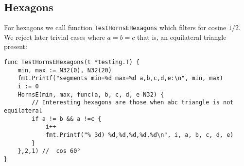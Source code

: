 \documentclass[11pt]{article}
\begin{document}
\newcommand{\horns}[8]{ %
 \begin{tikzpicture}
 \def\a{#3};\def\b{#4};\def\c{#5};\def\d{#6};\def\e{#7};\def\ang{#8}
 \pgfmathsetmacro\f{#4+#6}
 \pgfmathsetmacro\angB{(pow(#3,2) + pow(#5,2) - pow(#4,2))/(2*#3*#5)} %
 \pgfmathsetmacro\angC{(pow(#3,2) + pow(#4,2) - pow(#5,2))/(2*#3*#4)} %
 \begin{scope}
  \meccanostrip[FF0000]{#7}{#1}{#2} %
 \end{scope}
 \begin{scope}[shift={(#1*#7,0)},rotate=\ang]
  \meccanostrip[FF0000]{#7}{#1}{#2} %
  \begin{scope}[rotate=acos(\angB)]
   \meccanostrip[008800]{#5}{#1}{#2} %
  \end{scope}
  \begin{scope}[shift={(#1*#3,0)},rotate=180-acos(\angC)] %
   \meccanostrip[0000FF]{\f}{#1}{#2} %
  \end{scope}
 \end{scope}
 \begin{scope}[rotate=180-\ang]
  \meccanostrip[F00000]{#7}{#1}{#2} %
  \begin{scope}[rotate=-acos(\angB)]
   \meccanostrip[008800]{\c}{#1}{#2} %
  \end{scope}
  \begin{scope}[shift={(#1*\a,0)},rotate=180+acos(\angC)]
   \meccanostrip[0000FF]{\f}{#1}{#2} %
  \end{scope}
 \end{scope}
 \end{tikzpicture}
}

\subsection{Hexagons}
For hexagons we call function \texttt{TestHornsEHexagons} which filters for cosine $1/2$.
We reject later trivial cases where $a=b=c$ that is, an equilateral triangle present:
\begin{lstlisting}
func TestHornsEHexagons(t *testing.T) {
	min, max := N32(0), N32(20)
	fmt.Printf("segments min=%d max=%d a,b,c,d,e:\n", min, max)
	i := 0
	HornsE(min, max, func(a, b, c, d, e N32) {
		// Interesting hexagons are those when abc triangle is not equilateral
		if a != b && a !=c {
			i++
			fmt.Printf("% 3d) %d,%d,%d,%d,%d\n", i, a, b, c, d, e)
		}
	},2,1) //  cos 60°
}
\end{lstlisting}
\end{document}

